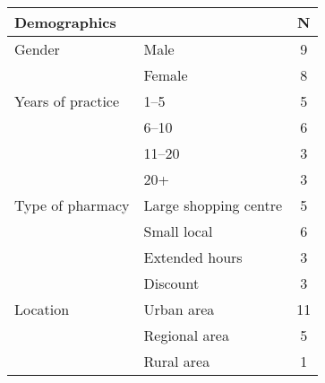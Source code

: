 \begin{table}[htb]
\centering
\begin{tabular}{llc}
\toprule
\multicolumn{2}{l}{\textbf{Demographics}}                                                                                                                   & \textbf{N}  \\
\midrule
Gender            & Male                                                                                                                           & 9  \T\\
                  & Female                                                                                                                         & 8  \\
Years of practice & 1--5                                                                                                                            & 5  \\
                  & 6--10                                                                                                                           & 6  \\
                  & 11--20                                                                                                                          & 3  \\
                  & 20+                                                                                                                            & 3  \\
Type of pharmacy  & Large shopping centre                                                                                                          & 5  \\
                  & Small local                                                                                                                    & 6  \\
                  & Extended hours                                                                                                                 & 3  \\
                  & Discount                                                                                                                       & 3  \\
Location          & Urban area                                                                                              & 11 \\
                  & Regional area  & 5  \\
                  & Rural area              & 1  \\

\end{tabular}
\end{table}
